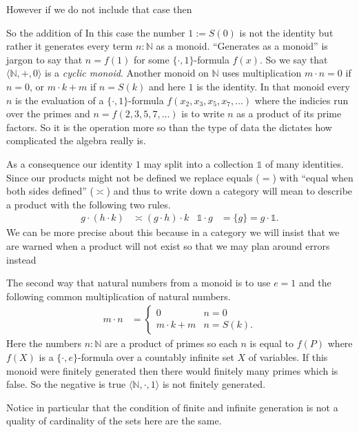 \documentclass[12pt,twoside,letterpaper]{memoir}
\newcommand{\one}{\mathds{1}}
\begin{document}
However if we do not include that case then 

So the addition of 
In this case 
the number $1:=S(0)$ is not the identity but rather it generates every term
$n:\mathbb{N}$ as a monoid.  ``Generates as a monoid'' is jargon to say that
$n=f(1)$ for some $\{\cdot,1\}$-formula $f(x)$.  So we say that $\langle
\mathbb{N},+,0\rangle$ is a \emph{cyclic monoid}. Another monoid on $\mathbb{N}$
uses multiplication $m\cdot n=0$ if $n=0$, or $m\cdot k+m$ if $n=S(k)$ and here
$1$ is the identity.  In that monoid every $n$ is the evaluation of a
$\{\cdot,1\}$-formula $f(x_2,x_3,x_5,x_7,\ldots)$ where the indicies run over
the primes and $n=f(2,3,5,7,\ldots)$ is to write $n$ as a product of its prime
factors.  So it is the operation more so than the type of data the dictates how
complicated the algebra really is.



As a consequence our identity $1$ may split into a 
collection $\one$ of many identities.  Since our products might not be defined 
we replace equals ($=$) with ``equal when both sides defined'' ($\asymp$)
and thus to write down a category will mean to describe a product 
with the following two rules.
\begin{align*}
    g\cdot (h\cdot k) & \asymp (g\cdot h)\cdot k 
    & 
    \one \cdot g & = \{g\} = g\cdot \one.
\end{align*}
We can be more precise about this because in a category we 
will insist that we are warned when a product will not exist 
so that we may plan around errors instead



The second way that natural numbers from a monoid is to use $e=1$ and the 
following common multiplication of natural numbers.
\begin{align*}
    m\cdot n & = \begin{cases} 0 & n=0 \\ m\cdot k +m & n=S(k).\end{cases}
\end{align*}
Here the numbers $n:\mathbb{N}$ are a product of primes so each 
$n$ is equal to $f(P)$ where $f(X)$ is a $\{\cdot,e\}$-formula over 
a countably infinite set $X$ of variables.  If this monoid were finitely generated 
then there would finitely many primes which is false.  So the negative is true
$\langle \mathbb{N},\cdot,1\rangle$ is not finitely generated.  

Notice in particular that the condition of finite and infinite generation is 
not a quality of cardinality of the sets here are the same.
\end{document}
